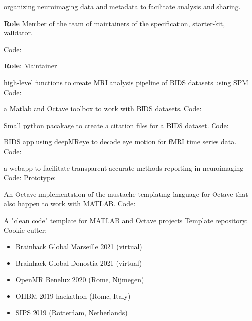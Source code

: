 
 organizing neuroimaging data and metadata to facilitate analysis and sharing.

\textbf{Role} Member of the team of maintainers of the specification, starter-kit, validator.

\textbullet Code: 

\vspace{5mm}


\textbf{Role}: Maintainer

 high-level functions to create MRI analysis pipeline of BIDS datasets using SPM
\textbullet Code: 

 a Matlab and Octave toolbox to work with BIDS datasets.
\textbullet Code: 

 Small python pacakage to create a citation files for a BIDS dataset.
\textbullet Code: 

 BIDS app using deepMReye to decode eye motion for fMRI time series data. 
\textbullet Code: 

 a webapp to facilitate transparent accurate methods reporting in neuroimaging
\textbullet Code:  
\textbullet Prototype: 
\textbullet {}

 An Octave implementation of the mustache templating language for Octave that also happen to work with MATLAB.  
\textbullet Code: 

 A "clean code" template for MATLAB and Octave projects 
\textbullet Template repository: 
\textbullet Cookie cutter: 

\vspace{5mm}



\begin{itemize}
    \item Brainhack Global Marseille 2021 (virtual) 
    \item Brainhack Global Donostia 2021 (virtual) 
    \item OpenMR Benelux 2020 (Rome, Nijmegen) 
    \item OHBM 2019 hackathon (Rome, Italy) 
\end{itemize}

\begin{itemize}
    \item SIPS 2019 (Rotterdam, Netherlands)
\end{itemize}
